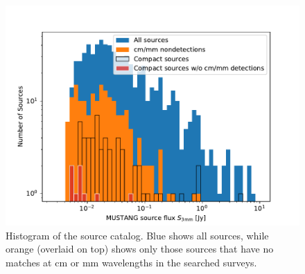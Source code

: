 \documentclass[twocolumn]{aastex62}
\def\todo#1{{\textcolor{red}{TODO: #1}}}
\begin{document}
\begin{figure}[htp]
    \includegraphics[width=17cm]{figures/full_catalog_histogram.pdf}
    \caption{Histogram of the source catalog.  Blue shows all sources,
    while orange (overlaid on top) shows only those sources that have
    no matches at cm or mm wavelengths in the searched surveys.}
\label{fig:fullcathist}
\end{figure}



% 
% 
\end{document}
